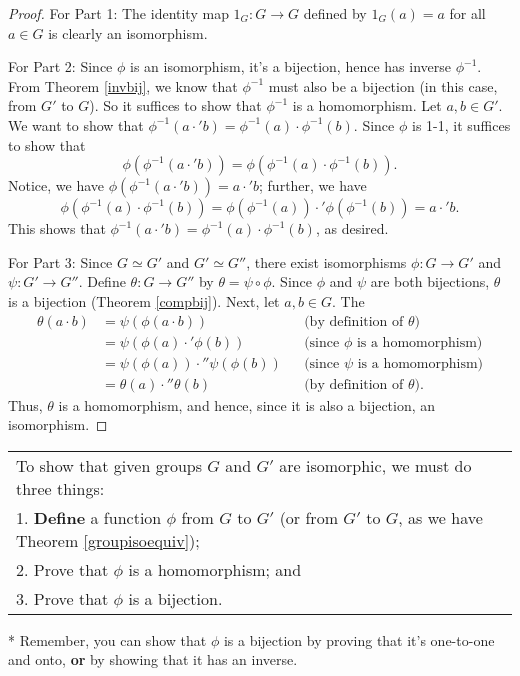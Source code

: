 \begin{proof} For Part 1: The identity map $1_G:G\to G$ defined by
$1_G(a)=a$ for all $a\in G$ is clearly an isomorphism.

For Part 2: Since $\phi$ is an isomorphism, it's a bijection, hence
has inverse $\phi^{-1}$.  From Theorem \ref{invbij}, we know that
$\phi^{-1}$ must also be a bijection (in this case, from $G'$ to
$G$).  So it suffices to show that $\phi^{-1}$ is a homomorphism.
Let $a,b\in G'$.  We want to show that
$\phi^{-1}(a\cdot'b)=\phi^{-1}(a)\cdot\phi^{-1}(b)$.  Since $\phi$ is 1-1, it suffices to show that $$\phi(\phi^{-1}(a\cdot'b))=\phi(\phi^{-1}(a)\cdot\phi^{-1}(b)).$$
Notice, we have
$\phi(\phi^{-1}(a\cdot'b))=a\cdot'b$; further, we have
$$\phi(\phi^{-1}(a)\cdot\phi^{-1}(b))=\phi(\phi^{-1}(a))\cdot'\phi(\phi^{-1}(b))=a\cdot'b.$$
This shows that
$\phi^{-1}(a\cdot'b)=\phi^{-1}(a)\cdot\phi^{-1}(b)$, as desired.

For Part 3: Since $G\simeq G'$ and $G'\simeq G''$, there exist
isomorphisms $\phi:G\to G'$ and $\psi:G'\to G''$.  Define
$\theta:G\to G''$ by $\theta=\psi \circ \phi$.  Since $\phi$ and
$\psi$ are both bijections, $\theta$ is a bijection (Theorem
\ref{compbij}).  Next, let $a,b\in G$.  The \begin{align*}
\theta(a\cdot b)&=\psi(\phi(a\cdot b))&&\text{(by definition of $\theta$)}\\
&=\psi(\phi(a)\cdot'\phi(b))&&\text{(since $\phi$ is a homomorphism)}\\
&=\psi(\phi(a))\cdot''\psi(\phi(b))&&\text{(since $\psi$ is a homomorphism)}\\
&=\theta(a)\cdot''\theta(b)&&\text{(by definition of $\theta$)}.
\end{align*}
Thus, $\theta$ is a homomorphism, and hence, since it is also a bijection, an isomorphism.\end{proof}


\begin{center}
\renewcommand{\arraystretch}{1.3}
\begin{threeparttable}
\begin{tabular}{|l|}
\hline
To show that given groups $G$ and $G'$ are isomorphic, we must do three things:\\
1. \textbf{Define} a function $\phi$ from $G$ to $G'$ (or from $G'$ to $G$, as we have Theorem \ref{groupisoequiv});\\
2. Prove that $\phi$ is a homomorphism; and\\
3. Prove that $\phi$ is a bijection.\tnote{*}\\
\hline
\end{tabular}
\begin{tablenotes}
\item[*]\small Remember, you can show that $\phi$ is a bijection by proving that it's one-to-one and onto, \textbf{or} by  showing that it has an inverse.
    \end{tablenotes}
\end{threeparttable}
\end{center}


